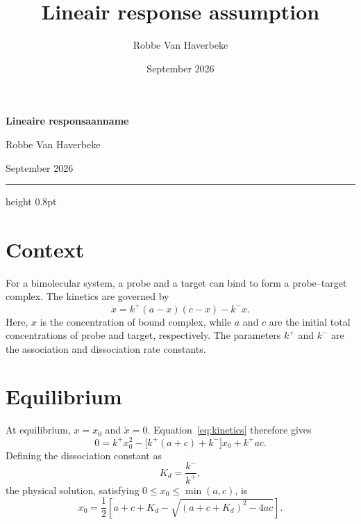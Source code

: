 \documentclass[11pt,a4paper]{article}
\title{Lineair response assumption}
\author{Robbe Van Haverbeke}
\date{September 2026}
\begin{document}
\begin{center}
    {\LARGE\sffamily\bfseries\color{accent}Lineaire responsaanname\par}
    \vspace{0.6em}
    {\normalsize Robbe Van Haverbeke\par}
    \vspace{0.2em}
    {\small\color{gray}September 2026\par}
\end{center}
\vspace{0.3em}
{\color{accent}\hrule height 0.8pt}
\vspace{0.5em}

\section{Context}
For a bimolecular system, a probe and a target can bind to form a
probe--target complex. The kinetics are governed by
\begin{equation}
    \dot{x}=k^+(a-x)(c-x)-k^-x.
    \label{eq:kinetics}
\end{equation}
Here, $x$ is the concentration of bound complex, while $a$ and $c$ are
the initial total concentrations of probe and target, respectively.
The parameters $k^+$ and $k^-$ are the association and dissociation
rate constants.

\section{Equilibrium}
At equilibrium, $x=x_0$ and $\dot{x}=0$. Equation~\eqref{eq:kinetics}
therefore gives
\begin{equation}
    0=k^+x_0^2-\bigl[k^+(a+c)+k^-\bigr]x_0+k^+ac.
    \label{eq:equilibrium}
\end{equation}
Defining the dissociation constant as
\begin{equation}
    K_d=\frac{k^-}{k^+},
\end{equation}
the physical solution, satisfying $0\leq x_0\leq\min(a,c)$, is
\begin{equation}
    \boxed{\displaystyle
    x_0=\frac{1}{2}\left[a+c+K_d-\sqrt{(a+c+K_d)^2-4ac}\right].}
    \label{eq:x0}
\end{equation}
\end{document}

